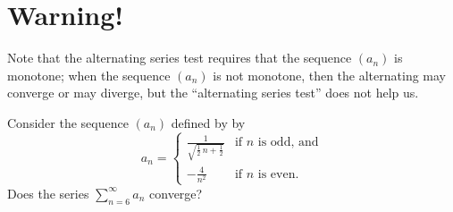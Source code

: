 \documentclass{ximera}
\begin{document}
\section{Warning!}

Note that the alternating series test requires that the sequence \((a_n)\) is monotone; when the sequence \((a_n)\) is not monotone, then the alternating may converge or may diverge, but the ``alternating series test'' does not help us.


\begin{question}
  Consider the sequence \((a_{n})\) defined by by
  \[
  a_{n} = \begin{cases}
    \displaystyle\frac{1}{\sqrt{\displaystyle\frac{1}{2} \, n + \displaystyle\frac{1}{2}}} & \mbox{if \(n\) is odd, and} \\
    -\displaystyle\frac{4}{n^{2}} & \mbox{if \(n\) is even.}
  \end{cases}
  \]
  Does the series \(\displaystyle\sum_{n=6}^\infty a_{n}\) converge?
  

\end{question}
\end{document}
